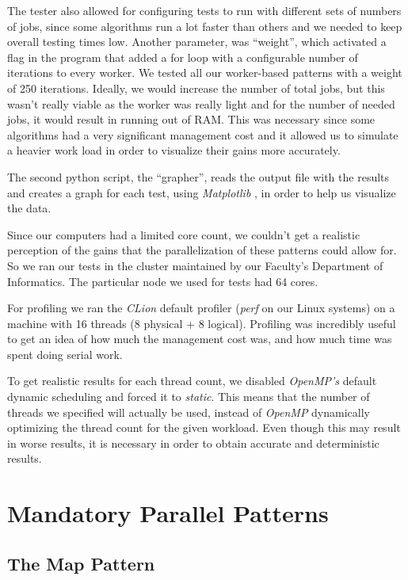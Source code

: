 \documentclass[10pt,journal]{IEEEtran}
\begin{document}
The tester also allowed for configuring tests to run with different sets of numbers of jobs, since some algorithms run a lot faster than others and we needed to keep overall testing times low.  Another parameter, was “weight”, which activated a flag in the program that added a for loop with a configurable number of iterations to every worker. We tested all our worker-based patterns with a weight of 250 iterations. Ideally, we would increase the number of total jobs, but this wasn't really viable as the worker was really light and for the number of needed jobs, it would result in running out of RAM. This was necessary since some algorithms had a very significant management cost and it allowed us to simulate a heavier work load in order to visualize their gains more accurately. 

The second python script, the “grapher”, reads the output file with the results and creates a graph for each test, using \textit{Matplotlib} \cite{matplotlib}, in order to help us visualize the data. 

Since our computers had a limited core count, we couldn’t get a realistic perception of the gains that the parallelization of these patterns could allow for. So we ran our tests in the cluster maintained by our Faculty’s Department of Informatics. The particular node we used for tests had 64 cores.

For profiling we ran the \textit{CLion} default profiler (\textit{perf} on our Linux systems) on a machine with 16 threads (8 physical + 8 logical). Profiling was incredibly useful to get an idea of how much the management cost was, and how much time was spent doing serial work.

To get realistic results for each thread count, we disabled \textit{OpenMP's} default dynamic scheduling and forced it to \textit{static}. This means that the number of threads we specified will actually be used, instead of \textit{OpenMP} dynamically optimizing the thread count for the given workload. Even though this may result in worse results, it is necessary in order to obtain  accurate and deterministic results.

\section{Mandatory Parallel Patterns}

\subsection{The Map Pattern}
\label{map}
\end{document}
